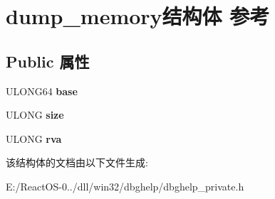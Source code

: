 \hypertarget{structdump__memory}{}\section{dump\+\_\+memory结构体 参考}
\label{structdump__memory}
\subsection*{Public 属性}
\begin{DoxyCompactItemize}
\item 
\mbox{\label{structdump__memory_a8281092f652bbdd784ab0ca039e4586f}} 
U\+L\+O\+N\+G64 {\bfseries base}
\item 
\mbox{\label{structdump__memory_a772eb4ba10a7c766006e96dfc39b7ce3}} 
U\+L\+O\+NG {\bfseries size}
\item 
\mbox{\label{structdump__memory_ad6740c9e0745569894f9b75d8a62c5ba}} 
U\+L\+O\+NG {\bfseries rva}
\end{DoxyCompactItemize}


该结构体的文档由以下文件生成\+:\begin{DoxyCompactItemize}
\item 
E\+:/\+React\+O\+S-\/0../dll/win32/dbghelp/dbghelp\+\_\+private.\+h\end{DoxyCompactItemize}
